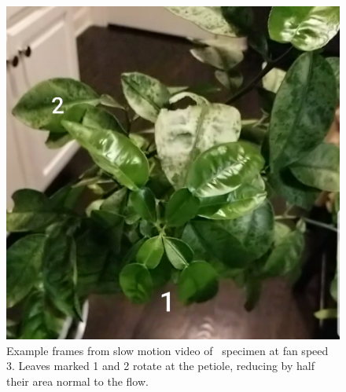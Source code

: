 \begin{figure}
\begin{center}
\includegraphics[width=0.49\columnwidth]{figures/Snapshot4.jpg}
\end{center}
\caption{Example frames from slow motion video of \Cxparadisi\ specimen at fan speed 3. Leaves marked 1 and 2 rotate at the petiole, reducing by half their area normal to the flow.}
\label{fig:results:leafmovement}
\end{figure}

